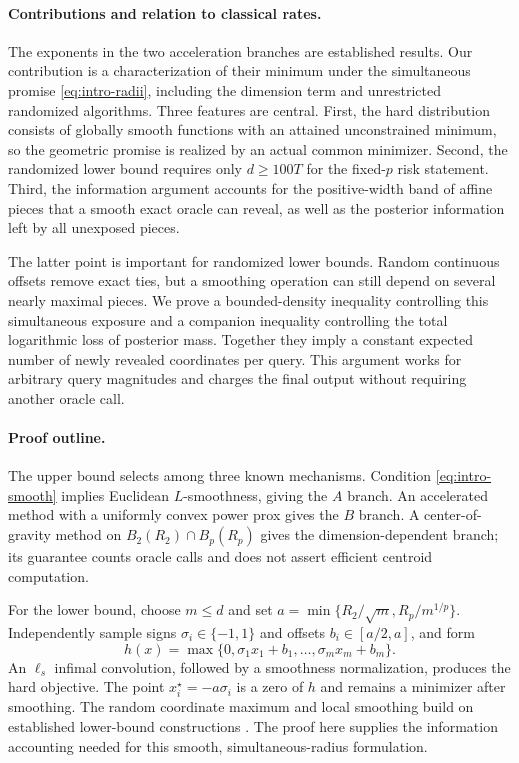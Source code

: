\documentclass[11pt]{article}
\theoremstyle{definition}
\theoremstyle{remark}
\begin{document}
\paragraph{Contributions and relation to classical rates.}
The exponents in the two acceleration branches are established results.
Our contribution is a characterization of their minimum under the
simultaneous promise \cref{eq:intro-radii}, including the dimension term
and unrestricted randomized algorithms. Three features are central.
First, the hard distribution consists of globally smooth functions with
an attained unconstrained minimum, so the geometric promise is realized
by an actual common minimizer. Second, the randomized lower bound requires
only $d\ge100T$ for the fixed-$p$ risk statement. Third, the information
argument accounts for the positive-width band of affine pieces that a
smooth exact oracle can reveal, as well as the posterior information
left by all unexposed pieces.

The latter point is important for randomized lower bounds. Random
continuous offsets remove exact ties, but a smoothing operation can still
depend on several nearly maximal pieces. We prove a bounded-density
inequality controlling this simultaneous exposure and a companion
inequality controlling the total logarithmic loss of posterior mass.
Together they imply a constant expected number of newly revealed
coordinates per query. This argument works for arbitrary query
magnitudes and charges the final output without requiring another
oracle call.

\paragraph{Proof outline.}
The upper bound selects among three known mechanisms.
Condition \cref{eq:intro-smooth} implies Euclidean $L$-smoothness, giving
the $A$ branch. An accelerated method with a uniformly convex power prox
gives the $B$ branch. A center-of-gravity method on
$B_2(R_2)\cap B_p(R_p)$ gives the dimension-dependent branch; its guarantee
counts oracle calls and does not assert efficient centroid computation.

For the lower bound, choose $m\le d$ and set
$a=\min\{R_2/\sqrt m,R_p/m^{1/p}\}$. Independently sample signs
$\sigma_i\in\{-1,1\}$ and offsets $b_i\in[a/2,a]$, and form
\[
 h(x)=\max\{0,\sigma_1x_1+b_1,\ldots,\sigma_mx_m+b_m\}.
\]
An $\ell_s$ infimal convolution, followed by a smoothness normalization,
produces the hard objective. The point $x_i^\star=-a\sigma_i$ is a zero
of $h$ and remains a minimizer after smoothing. The random
coordinate maximum and local smoothing build on established lower-bound
constructions \citep{GuzmanNemirovski2015,BraunGuzmanPokutta2017}.
The proof here supplies the information accounting needed for this
smooth, simultaneous-radius formulation.
\end{document}
